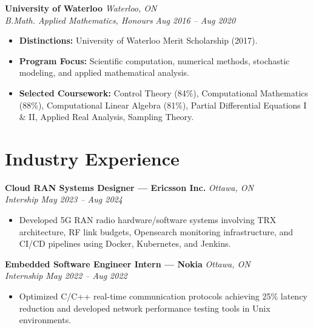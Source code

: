 \documentclass[11pt, letterpaper]{article}
\newcommand{\cventry}[4]{
    \noindent\textbf{#1} \hfill \textit{#2} \\
    \textit{#3} \hfill \textit{\small #4} \\
    \vspace{-4pt}
}
\begin{document}
\vspace{6pt}

\cventry{University of Waterloo}{Waterloo, ON}{B.Math. Applied Mathematics, Honours}{Aug 2016 -- Aug 2020}

\begin{itemize}[leftmargin=1.5em, topsep=2pt, itemsep=2pt]
    \item \textbf{Distinctions:} University of Waterloo Merit Scholarship (2017).

    \item \textbf{Program Focus:} Scientific computation, numerical methods, stochastic modeling, and applied mathematical analysis.

    \item \textbf{Selected Coursework:} Control Theory (84\%), Computational Mathematics (88\%), Computational Linear Algebra (81\%), Partial Differential Equations I \& II, Applied Real Analysis, Sampling Theory.
\end{itemize}

\section{Industry Experience}

\cventry{Cloud RAN Systems Designer --- Ericsson Inc.}{Ottawa, ON}{Intership}{May 2023 -- Aug 2024}

\begin{itemize}[leftmargin=1.5em, topsep=2pt, itemsep=0pt]
    \item Developed 5G RAN radio hardware/software systems involving TRX architecture, RF link budgets, Opensearch monitoring infrastructure, and CI/CD pipelines using Docker, Kubernetes, and Jenkins.
\end{itemize}

\vspace{4pt}

\cventry{Embedded Software Engineer Intern --- Nokia}{Ottawa, ON}{Internship}{May 2022 -- Aug 2022}

\begin{itemize}[leftmargin=1.5em, topsep=2pt, itemsep=0pt]
    \item Optimized C/C++ real-time communication protocols achieving 25\% latency reduction and developed network performance testing tools in Unix environments.
\end{itemize}

\vspace{4pt}
\end{document}
